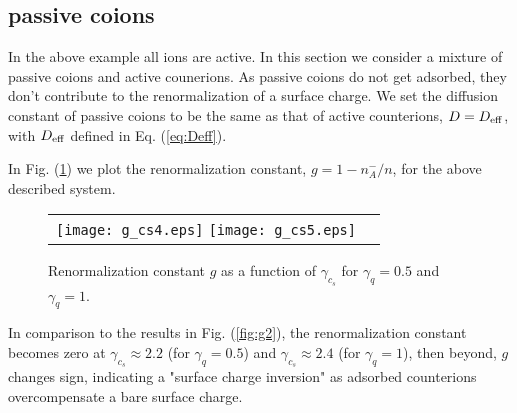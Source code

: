 \documentclass[pre,twocolumn,graphicx]{revtex4-1}
\begin{document}
\subsection{passive coions}

In the above example all ions are active.  In this section we consider a mixture of passive coions and 
active counerions.  As passive coions do not get adsorbed, they don't contribute to the renormalization
of a surface charge.  We set the diffusion constant of passive coions to be the same as that of active 
counterions, $D=D_{\rm eff}$, with $D_{\rm eff}$ defined in Eq. (\ref{eq:Deff}).  


In Fig. (\ref{fig:g3}) we plot the renormalization constant, $g=1-n_A^-/n$, for the 
above described system.  
\graphicspath{{figures/}}
\begin{figure}[h] 
 \begin{center}
 \begin{tabular}{rr}
  \texttt{[image: g\_cs4.eps]}
  \texttt{[image: g\_cs5.eps]}
 \end{tabular}
 \end{center}
\caption{Renormalization constant $g$ as a function of $\gamma_{c_s}$ for $\gamma_q=0.5$ 
and $\gamma_q=1$.  } 
\label{fig:g3}
\end{figure}
In comparison to the results in Fig. (\ref{fig:g2}), the renormalization constant becomes zero at 
$\gamma_{c_s}\approx 2.2$ (for $\gamma_q=0.5$) and $\gamma_{c_s}\approx 2.4$ (for $\gamma_q=1$), then
beyond, $g$ changes sign, indicating a "surface charge inversion" as adsorbed 
counterions overcompensate a bare surface charge.  
\end{document}
